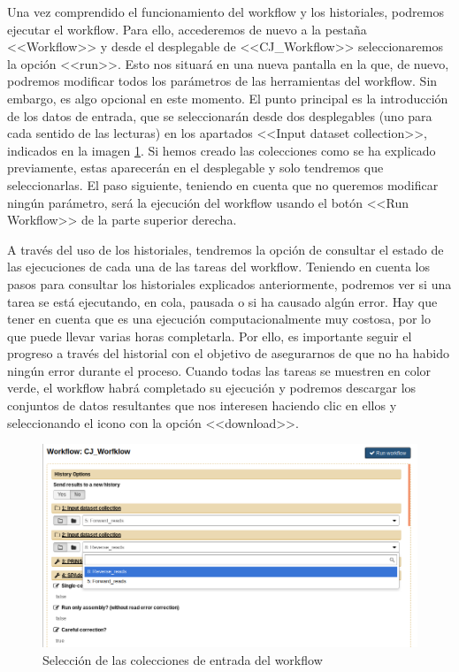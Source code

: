 Una vez comprendido el funcionamiento del workflow y los historiales, podremos ejecutar el workflow. Para ello, accederemos de nuevo a la pestaña <<Workflow>> y desde el desplegable de <<CJ\_Workflow>> seleccionaremos la opción <<run>>. Esto nos situará en una nueva pantalla en la que, de nuevo, podremos modificar todos los parámetros de las herramientas del workflow. Sin embargo, es algo opcional en este momento. El punto principal es la introducción de los datos de entrada, que se seleccionarán desde dos desplegables (uno para cada sentido de las lecturas) en los apartados <<Input dataset collection>>, indicados en la imagen \ref{fig:RunInputs}. Si hemos creado las colecciones como se ha explicado previamente, estas aparecerán en el desplegable y solo tendremos que seleccionarlas. El paso siguiente, teniendo en cuenta que no queremos modificar ningún parámetro, será la ejecución del workflow usando el botón <<Run Workflow>> de la parte superior derecha.

A través del uso de los historiales, tendremos la opción de consultar el estado de las ejecuciones de cada una de las tareas del workflow. Teniendo en cuenta los pasos para consultar los historiales explicados anteriormente, podremos ver si una tarea se está ejecutando, en cola, pausada o si ha  causado algún error. Hay que tener en cuenta que es una ejecución computacionalmente muy costosa, por lo que puede llevar varias horas completarla. Por ello, es importante seguir el progreso a través del historial con el objetivo de asegurarnos de que no ha habido ningún error durante el proceso. Cuando todas las tareas se muestren en color verde, el workflow habrá completado su ejecución y podremos descargar los conjuntos de datos resultantes que nos interesen haciendo clic en ellos y seleccionando el icono con la opción <<download>>.

\begin{figure}
    \begin{center}
      \includegraphics[scale=0.5]{images/RunInputs.png}
      \caption{Selección de las colecciones de entrada del workflow}
      \label{fig:RunInputs}
    \end{center}
\end{figure}

